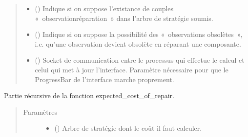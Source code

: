 \documentclass[letterpaper,10pt,french]{sphinxmanual}
\begin{document}
\begin{fulllineitems}
\begin{fulllineitems}
\begin{quote}
\begin{description}
\begin{itemize}
\item {} 
 (\sphinxstyleliteralemphasis{\sphinxupquote{, }}) \textendash{} Indique si on suppose l’existance de couples
« observation\sphinxhyphen{}réparation » dans l’arbre de stratégie soumis.

\item {} 
 (\sphinxstyleliteralemphasis{\sphinxupquote{, }}) \textendash{} Indique si on suppose la possibilité des « observations obsolètes »,
i.e. qu’une observation devient obsolète en réparant une
composante.

\item {} 
 (\sphinxstyleliteralemphasis{\sphinxupquote{, }}) \textendash{} Socket de communication entre le processus qui effectue le calcul
et celui qui met à jour l’interface. Paramètre nécessaire pour que
le ProgressBar de l’interface marche proprement.

\end{itemize}

\end{description}\end{quote}

\end{fulllineitems}


\begin{fulllineitems}
\label{\detokenize{index:DecisionTheoreticTroubleshooting.TroubleShootingProblem._expected_cost_of_repair_internal}}
Partie récursive de la fonction expected\_cost\_of\_repair.
\begin{quote}\begin{description}
\item[{Paramètres}] \leavevmode\begin{itemize}
\item {} 
 ({\hyperref[\detokenize{index:StrategyTree.StrategyTree}]{}}) \textendash{} Arbre de stratégie dont le coût il faut calculer.


\end{itemize}
\end{description}
\end{quote}
\end{fulllineitems}
\end{fulllineitems}
\end{document}
